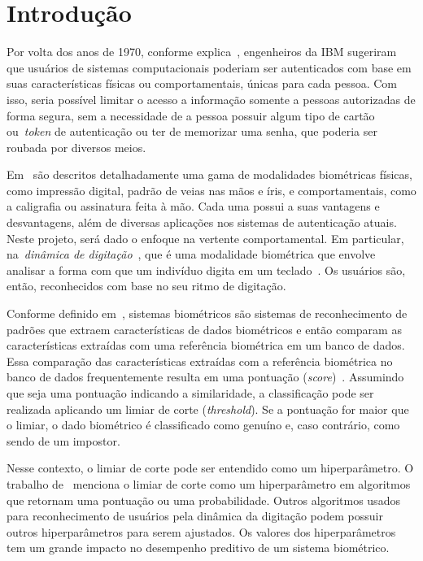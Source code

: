 \section{Introdução}\label{sec:introduacao}

Por volta dos anos de 1970, conforme explica~, engenheiros da IBM sugeriram que usuários de sistemas computacionais poderiam ser autenticados com base em suas características físicas ou comportamentais, únicas para cada pessoa. Com isso, seria possível limitar o acesso a informação somente a pessoas autorizadas de forma segura, sem a necessidade de a pessoa possuir algum tipo de cartão ou~\textit{token} de autenticação ou ter de memorizar uma senha, que poderia ser roubada por diversos meios.

Em~\cite{handbook_of_biometrics} são descritos detalhadamente uma gama de modalidades biométricas físicas, como impressão digital, padrão de veias nas mãos e íris, e comportamentais, como a caligrafia ou assinatura feita à mão. Cada uma possui a suas vantagens e desvantagens, além de diversas aplicações nos sistemas de autenticação atuais. Neste projeto, será dado o enfoque na vertente comportamental. Em particular, na~\textit{dinâmica de digitação}~\cite{Roy2022systematic}, que é uma modalidade biométrica que envolve analisar a forma com que um indivíduo digita em um teclado~\cite{monrose2000keystroke}. Os usuários são, então, reconhecidos com base no seu ritmo de digitação.

Conforme definido em~\cite{Jain2004_IntroToBiometrics}, sistemas biométricos são sistemas de reconhecimento de padrões que extraem características de dados biométricos e então comparam as características extraídas com uma referência biométrica em um banco de dados. Essa comparação das características extraídas com a referência biométrica no banco de dados frequentemente resulta em uma pontuação (\textit{score})~\cite{Jain2016_50Years}. Assumindo que seja uma pontuação indicando a similaridade, a classificação pode ser realizada aplicando um limiar de corte (\textit{threshold}). Se a pontuação for maior que o limiar, o dado biométrico é classificado como genuíno e, caso contrário, como sendo de um impostor.

Nesse contexto, o limiar de corte pode ser entendido como um hiperparâmetro. O trabalho de~ menciona o limiar de corte como um hiperparâmetro em algoritmos que retornam uma pontuação ou uma probabilidade. Outros algoritmos usados para reconhecimento de usuários pela dinâmica da digitação podem possuir outros hiperparâmetros para serem ajustados. Os valores dos hiperparâmetros tem um grande impacto no desempenho preditivo de um sistema biométrico.

